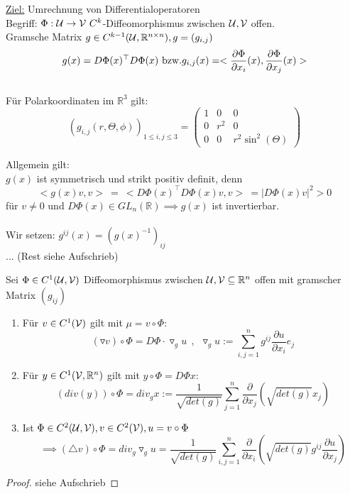   \begin{remark}
    \underline{Ziel:} Umrechnung von Differentialoperatoren\\
    Begriff: $\Phi: \script{U} \to \script{V} \ C^k$-Diffeomorphismus zwischen $\mathcal{U}, \mathcal{V}$ offen.\\
    Gramsche Matrix $g \in C^{k-1}(\mathcal{U}, \mathbb{R}^{n\times n}), g = (g_{i,j})$
    $$g(x) = D\Phi(x)^{\top} D\Phi(x) \text{ bzw.}\\
    g_{i,j}(x) = <\frac{\partial\Phi}{\partial x_i}(x), \frac{\partial\Phi}{\partial x_j}(x)>$$\\
    Für Polarkoordinaten im $\mathbb{R}^3$ gilt:
    $$(g_{i,j}(r, \Theta, \phi))_{1\leq i,j \leq 3} = \left(\begin{array}{ccc}
      1 & 0 & 0 \\
      0 & r^2 & 0 \\
      0 & 0 & r^2 \sin^2(\Theta)      
    \end{array}\right)$$
    
    \newpage

    Allgemein gilt:\\
    $g(x)$ ist symmetrisch und strikt positiv definit, denn
    $$<g(x)v,v> \ = \ <D\Phi(x)^{\top}D\Phi(x) v, v> \ = |D\Phi(x) v|^2 > 0$$
    für $v\neq 0$ und $D\Phi(x) \in GL_n(\mathbb{R}) \implies g(x)$ ist invertierbar.\\
    \\
    Wir setzen: $g^{ij}(x) = (g(x)^{-1})_{ij}$\\
    ... (Rest siehe Aufschrieb)
  \end{remark}

  \begin{theorem}
    Sei $\Phi \in C^1(\mathcal{U}, \mathcal{V})$ Diffeomorphismus zwischen $\mathcal{U}, \mathcal{V} \subseteq \mathbb{R}^n$ offen mit gramscher Matrix $(g_{ij})$
    \begin{enumerate}
      \item Für $v \in C^1(\mathcal{V})$ gilt mit $\mu = v \circ \Phi$:
      $$(\triangledown v) \circ \Phi = D\Phi \cdot \triangledown_g u \ \ , \ \ \triangledown_g u := \sum\limits_{i,j=1}^n g^{ij} \frac{\partial u}{\partial x_i} e_j$$
      \item Für $y \in C^1(\mathcal{V}, \mathbb{R}^n)$ gilt mit $y \circ \Phi = D\Phi x$:
        $$(div(y)) \circ \Phi = div_g x := \frac{1}{\sqrt{det(g)}} \sum\limits_{j=1}^n \frac{\partial}{\partial x_j} (\sqrt{det(g)} x_j)$$
      \item Ist $\Phi \in C^2(\mathcal{U}, \mathcal{V}), v \in C^2(\mathcal{V}), u = v \circ \Phi$
        $$\implies (\triangle v) \circ \Phi = div_g \triangledown_g u = \frac{1}{\sqrt{det(g)}} \sum\limits_{i,j=1}^n \frac{\partial}{\partial x_i} (\sqrt{det(g)} g^{ij} \frac{\partial u}{\partial x_j})$$
    \end{enumerate}
  \end{theorem}
  \begin{proof}
    siehe Aufschrieb
  \end{proof}

